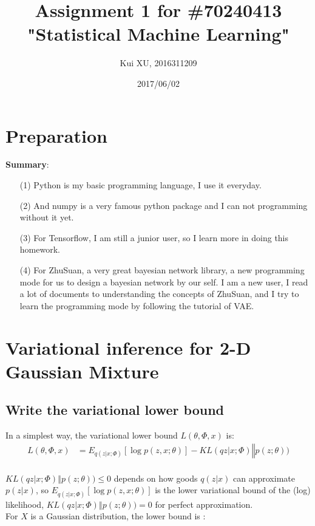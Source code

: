 \documentclass[a4paper]{article}
\title{Assignment 1 for \#70240413 \\ "Statistical Machine Learning" }
\author{Kui XU, 2016311209}
\date{2017/06/02}
\begin{document}
\maketitle

\section{Preparation}

\textbf{Summary}: 
\begin{enumerate}
\item[(1)] Python is my basic programming language, I use it everyday.
\item[(2)] And numpy is a very famous python package and I can not programming without it yet. 
\item[(3)] For Tensorflow, I am still a junior user, so I learn more in doing this homework.
\item[(4)] For ZhuSuan, a very great bayesian network library, a new programming mode for us to design a bayesian network by our self. I am a new user, I read a lot of documents to understanding the concepts of ZhuSuan, and I try to learn the programming mode by following the tutorial of VAE.
\end{enumerate}


\section{Variational inference for 2-D Gaussian Mixture}

\subsection{Write the variational lower bound}
In a simplest way, the variational lower bound $L(\theta, \Phi, x)$ is:
\begin{equation}
    \begin{aligned}
        L(\theta, \Phi, x) &= E_{q(z|x;\Phi)}[\log p(z,x;\theta) ] - KL(q z|x;\Phi) ‖ p(z; \theta))\\
    \end{aligned}
\end{equation}

$KL(q z|x;\Phi) ‖ p(z; \theta)) \le 0 $ depends on how goods $q(z|x)$ can approximate $p(z|x)$, so 
$E_{q(z|x;\Phi)}[\log p(z,x;\theta) ]$ is the lower variational bound of the (log) likelihood,  
$KL(q z|x;\Phi) ‖ p(z; \theta)) = 0 $ for perfect approximation.
\\
For $X$ is a Gaussian distribution, the lower bound is :
\end{document}
